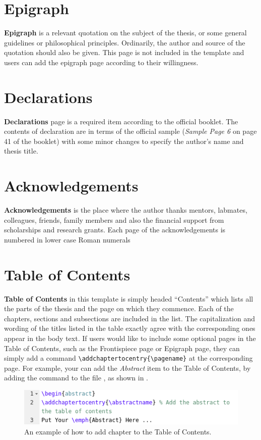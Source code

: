 \section{Epigraph}
\label{chap2:sec3:epigraph}
\textbf{Epigraph} is a relevant quotation on the subject of the thesis, or some general guidelines or philosophical principles. Ordinarily, the author and source of the quotation should also be given. This page is not included in the template and users can add the epigraph page according to their willingness.


\section{Declarations}
\label{chap2:sec4:declarations}
\textbf{Declarations} page is a required item according to the official booklet. The contents of declaration are in terms of the official sample (\textit{Sample Page 6} on page 41 of the booklet) with some minor changes to specify the author's name and thesis title.


\section{Acknowledgements}
\label{chap2:sec5:acknowledgements}
\textbf{Acknowledgements} is the place where the author thanks mentors, labmates, colleagues, friends, family members and also the financial support from scholarships and research grants. Each page of the acknowledgements is numbered in lower case Roman numerals


\section{Table of Contents}
\label{chap2:sec6:table_of_contents}
\textbf{Table of Contents} in this template is simply headed ``Contents'' which lists all the parts of the thesis and the page on which they commence. Each of the chapters, sections and subsections are included in the list. The capitalization and wording of the titles listed in the table exactly agree with the corresponding ones appear in the body text. If users would like to include some optional pages in the Table of Contents, such as the Frontispiece page or Epigraph page, they can simply add a command \verb|\addchaptertocentry{\pagename}| at the corresponding page. For example, your can add the \textit{Abstract} item to the Table of Contents, by adding the command to the file , as shown in .
\begin{figure}[!h]
    \centering
    \includegraphics[width=.8\textwidth]{Figures/Chapter2/add_command_example.png}
    \caption{An example of how to add chapter to the Table of Contents.}\label{fig:chap2:example_add_command}
\end{figure}


